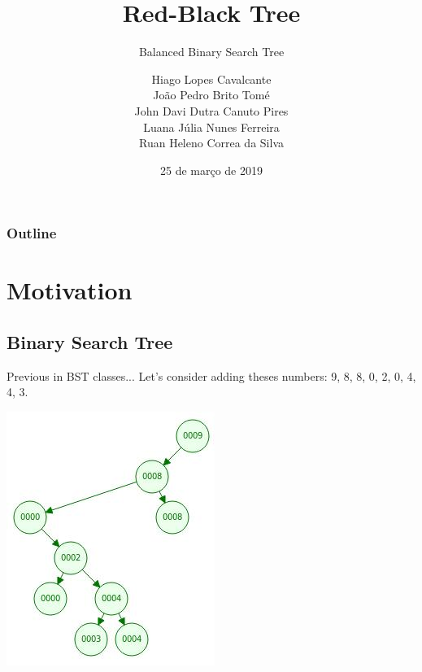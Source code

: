 \documentclass{beamer}
\title[Universidade Federal de Alagoas]{
  Red-Black Tree}
\subtitle{Balanced Binary Search Tree}
\author[Data Structure]{
  Hiago Lopes Cavalcante\\João Pedro Brito Tomé\\John Davi Dutra Canuto Pires\\Luana Júlia Nunes Ferreira\\Ruan Heleno Correa da Silva\medskip}
\institute[Instituto de Computação]{
  Universidade Federal de Alagoas\\ Instituto de Computação}
\date[Red-Black Tree]{25 de março de 2019}
\begin{document}
\begin{frame}
  \titlepage
\end{frame}

\begin{frame}
    \frametitle{Outline}
    \tableofcontents
\end{frame}

\section{Motivation}

\subsection{Binary Search Tree}

\begin{frame}{Previous in BST classes...}
Let's consider adding theses numbers: 9, 8, 8, 0, 2, 0, 4, 4, 3. %
\begin{center}
\includegraphics[scale=0.6]{bst.jpeg}
\end{center}
\end{frame}
\end{document}
